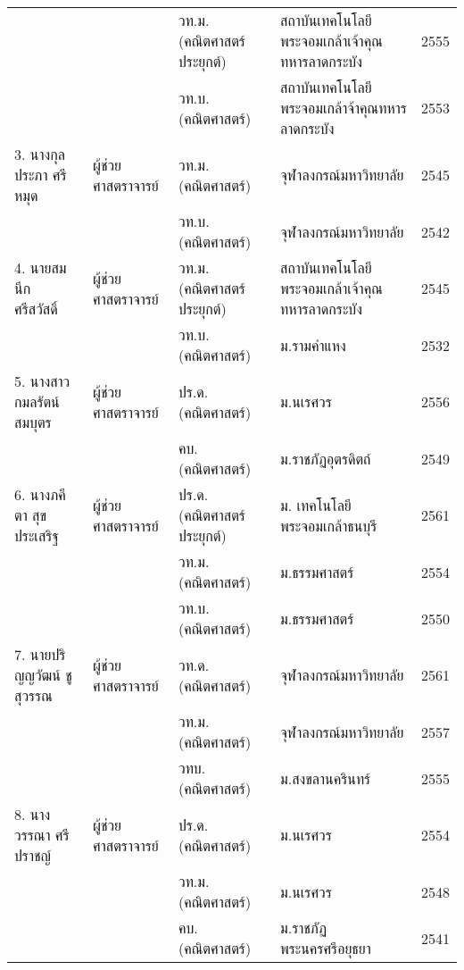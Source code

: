 {\begin{center}
{\begin{longtable}{|p{}|p{}|p{}|p{}|p{}|}
				&&วท.ม. (คณิตศาสตร์ประยุกต์)&สถาบันเทคโนโลยีพระจอมเกล้าเจ้าคุณทหารลาดกระบัง&2555\\
				\cline{3-5}
				&& วท.บ. (คณิตศาสตร์)&สถาบันเทคโนโลยีพระจอมเกล้าจ้าคุณทหารลาดกระบัง&2553\\
					\hline
					
		
		
		\multirow{1}{*}{3. นางกุลประภา ศรีหมุด}
				&ผู้ช่วยศาสตราจารย์&วท.ม. (คณิตศาสตร์)&จุฬาลงกรณ์มหาวิทยาลัย&2545\\	\cline{3-5}
				&&วท.บ. (คณิตศาสตร์)&จุฬาลงกรณ์มหาวิทยาลัย&2542\\	
				\hline
				
		
		\multirow{1}{*}{4. นายสมนึก ศรีสวัสดิ์}
				&ผู้ช่วยศาสตราจารย์& วท.ม. (คณิตศาสตร์ประยุกต์)&สถาบันเทคโนโลยีพระจอมเกล้าเจ้าคุณทหารลาดกระบัง&2545\\
				\cline{3-5}
				&&วท.บ. (คณิตศาสตร์)&ม.รามคำแหง&2532\\
				\hline
				
				
		\multirow{1}{*}{5. นางสาวกมลรัตน์ สมบุตร}
				&ผู้ช่วยศาสตราจารย์&ปร.ด. (คณิตศาสตร์)&ม.นเรศวร&2556\\
				\cline{3-5}
				&&คบ. (คณิตศาสตร์)&ม.ราชภัฏอุตรดิตถ์&2549\\
				\hline

		\multirow{1}{*}{6. นางภคีตา สุขประเสริฐ}&	ผู้ช่วยศาสตราจารย์ & ปร.ด. (คณิตศาสตร์ประยุกต์)& ม. เทคโนโลยี\newline พระจอมเกล้าธนบุรี& 2561\\\cline{3-5}
			&& วท.ม. (คณิตศาสตร์)& 	ม.ธรรมศาสตร์& 2554\\\cline{3-5}
			&& วท.บ. (คณิตศาสตร์)& 	ม.ธรรมศาสตร์&2550\\	\hline


		\multirow{1}{*}{7. นายปริญญวัฒน์ ชูสุวรรณ}&ผู้ช่วยศาสตราจารย์&	วท.ด. (คณิตศาสตร์)&จุฬาลงกรณ์มหาวิทยาลัย&2561\\\cline{3-5}
		&&วท.ม. (คณิตศาสตร์)& 	จุฬาลงกรณ์มหาวิทยาลัย& 2557\\\cline{3-5}
		&&วทบ. (คณิตศาสตร์)& ม.สงขลานครินทร์&	2555\\	\hline
		
		
		\multirow{1}{*}{8.  นางวรรณา ศรีปราชญ์}& ผู้ช่วยศาสตราจารย์& ปร.ด. (คณิตศาสตร์)& ม.นเรศวร& 2554\\\cline{3-5}
		&& วท.ม. (คณิตศาสตร์)&	ม.นเรศวร&2548\\\cline{3-5}
		&& คบ. (คณิตศาสตร์)& ม.ราชภัฏพระนครศรีอยุธยา& 2541\\\hline
		


\end{longtable}}
\end{center}}

